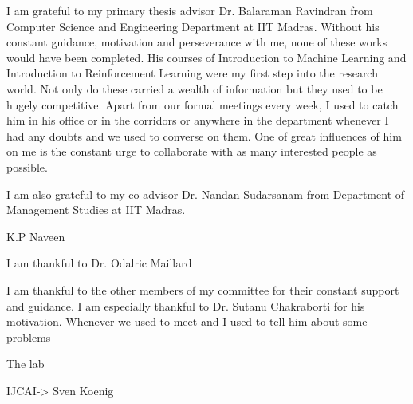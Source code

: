 I am grateful to my primary thesis advisor Dr. Balaraman Ravindran from Computer Science and Engineering Department at IIT Madras. Without his constant guidance, motivation and perseverance with me, none of these works would have been completed. His courses of Introduction to Machine Learning and Introduction to Reinforcement Learning were my first step into the research world. Not only do these carried a wealth of information but they used to be hugely competitive. Apart from our  formal meetings every week, I used to catch him in his office or in the corridors or anywhere in the department whenever I had any doubts and we used to converse on them. One of great influences of him on me is the constant urge to collaborate with as many interested people as possible.

I am also grateful to my co-advisor Dr. Nandan Sudarsanam from Department of Management Studies at IIT Madras.

K.P Naveen

I am thankful to Dr. Odalric Maillard 

I am thankful to the other members of my committee for their constant support and guidance. I am especially thankful to Dr.  Sutanu Chakraborti for his motivation. Whenever we used to meet and I used to tell him about some problems 


The lab


IJCAI-> Sven Koenig

